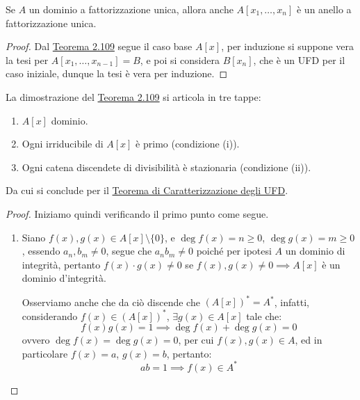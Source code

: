 \documentclass[11pt]{scrartcl}
\begin{document}
\begin{corollary}
    Se $A$ un dominio a fattorizzazione unica, allora anche $A[x_1,\ldots,x_n]$ è un anello a fattorizzazione unica.
\end{corollary}

\begin{proof}
    Dal \hyperref[2.109]{Teorema 2.109} segue il caso base $A[x]$, per induzione si suppone vera la tesi per $A[x_1,\ldots,x_{n-1}] = B$, e poi si considera $B[x_n]$, che è un UFD per il caso iniziale,
    dunque la tesi è vera per induzione.
\end{proof}

\begin{remark}
    La dimostrazione del \hyperref[2.109]{Teorema 2.109} si articola in tre tappe:
    \begin{enumerate}[(1)]
        \item $A[x]$ dominio.
        \item Ogni irriducibile di $A[x]$ è primo (condizione (i)).
        \item Ogni catena discendete di divisibilità è stazionaria (condizione (ii)).
    \end{enumerate}
    Da cui si conclude per il \hyperref[2.101]{Teorema di Caratterizzazione degli UFD}.
\end{remark}

\begin{proof}
    Iniziamo quindi verificando il primo punto come segue.
    \begin{enumerate}[(1)]
        \item Siano $f(x),g(x) \in A[x] \setminus\{0\}$, e $\deg f(x) = n \geq 0$, $\deg g(x) = m \geq 0$, essendo $a_n, b_m \ne 0$, segue che
        $a_nb_m \ne 0$ poiché per ipotesi $A$ un dominio di integrità, pertanto $f(x) \cdot g(x) \ne 0$ se $f(x),g(x) \ne 0 \implies A[x]$ è un dominio d'integrità.
        \begin{remark}
            Osserviamo anche che da ciò discende che $(A[x])^* = A^*$, infatti, considerando $f(x) \in (A[x])^*$, $\exists g(x) \in A[x]$ tale che:
            \[ f(x)g(x) = 1 \implies \deg f(x) + \deg g(x) = 0
                \]
            ovvero $\deg f(x) = \deg g(x) = 0$, per cui $f(x),g(x) \in A$, ed in particolare $f(x) = a$, $g(x) = b$, pertanto:
            \[ ab = 1 \implies f(x) \in A^*
                \]
        \end{remark}
    \end{enumerate}
\end{proof}
\end{document}
